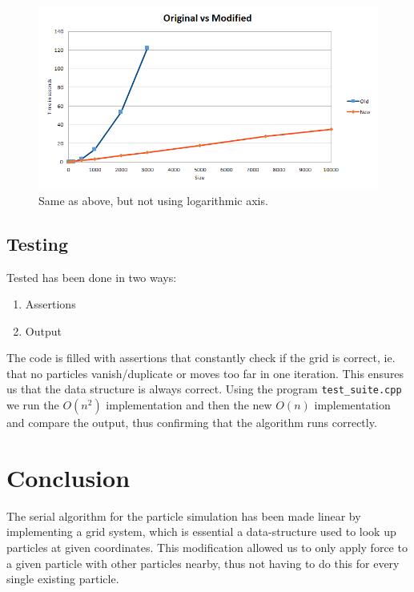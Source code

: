 \documentclass[a4paper,11pt,oneside]{book}
\begin{document}
\begin{figure}[H]
  \centering
  \begin{minipage}[b]{0.9\textwidth}
    \includegraphics[width=\textwidth]{graph_regular.png}
    \caption{Same as above, but not using logarithmic axis.}
  \end{minipage}
\end{figure}

\section{Testing}
Tested has been done in two ways:
\begin{enumerate}
\item Assertions
\item Output
\end{enumerate}

The code is filled with assertions that constantly check if the grid is correct, ie. that no particles vanish/duplicate or moves too far in one iteration. This ensures us that the data structure is always correct. Using the program \verb!test_suite.cpp! we run the $O(n^{2})$ implementation and then the new $O(n)$ implementation and compare the output, thus confirming that the algorithm runs correctly.




\chapter{Conclusion}
The serial algorithm for the particle simulation has been made linear by implementing a grid system, which is essential a data-structure used to look up particles at given coordinates. This modification allowed us to only apply force to a given particle with other particles nearby, thus not having to do this for every single existing particle.
\end{document}
